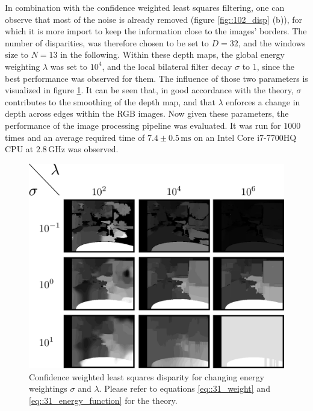 In combination with the confidence weighted least squares filtering, one can observe that most of the noise is already removed (figure \ref{fig::102_disp} (b)), for which it is more import to keep the information close to the images' borders. The number of disparities, was therefore chosen to be set to $D=32$, and the windows size to $N=13$ in the following. Within these depth maps, the global energy weighting $\lambda$ was set to $10^4$, and the local bilateral filter decay $\sigma$ to $1$, since the best performance was observed for them. The influence of those two parameters is visualized in figure \ref{fig::102_sigma_lambda}. It can be seen that, in good accordance with the theory, $\sigma$ contributes to the smoothing of the depth map, and that $\lambda$ enforces a change in depth across edges within the RGB images. Now given these parameters, the performance of the image processing pipeline was evaluated. It was run for $1000$ times and an average required time of $7.4\pm0.5\,\text{ms}$ on an Intel Core i7-7700HQ CPU at $2.8\,\text{GHz}$ was observed.
\begin{figure}[h!]
	\centering
	\includegraphics[scale=.2]{chapters/10_image_processing_experiments/img/sigma_lambda.png}
	\caption{Confidence weighted least squares disparity for changing energy weightings $\sigma$ and $\lambda$. Please refer to equations \ref{eq::31_weight} and \ref{eq::31_energy_function} for the theory.}
	\label{fig::102_sigma_lambda}
\end{figure}